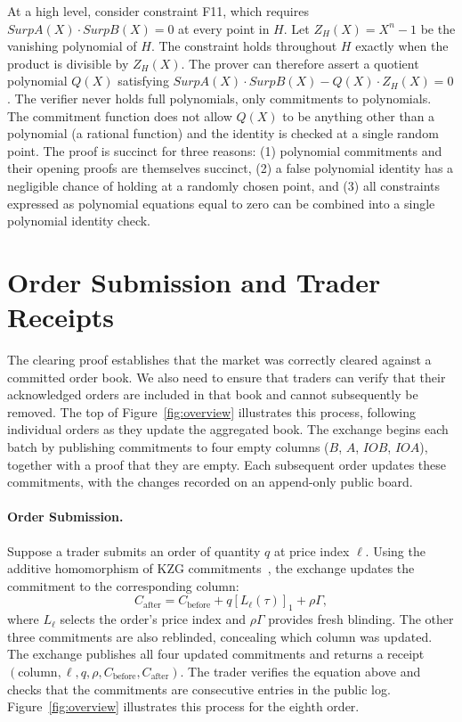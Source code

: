At a high level, consider constraint F11, which requires $SurpA(X)\cdot SurpB(X)=0$ at every point in $H$. Let $Z_H(X)=X^n-1$ be the vanishing polynomial of $H$. The constraint holds throughout $H$ exactly when the product is divisible by $Z_H(X)$. The prover can therefore assert a quotient polynomial $Q(X)$ satisfying $SurpA(X)\cdot SurpB(X)-Q(X)\cdot Z_H(X)=0$. The verifier never holds full polynomials, only commitments to polynomials. The commitment function does not allow $Q(X)$ to be anything other than a polynomial (\ie a rational function) and the identity is checked at a single random point. The proof is succinct for three reasons: (1) polynomial commitments and their opening proofs are themselves succinct, (2) a false polynomial identity has a negligible chance of holding at a randomly chosen point, and (3) all constraints expressed as polynomial equations equal to zero can be combined into a single polynomial identity check.

\section{Order Submission and Trader Receipts}
\label{sec:order-receipts}

The clearing proof establishes that the market was correctly cleared against a committed order book. We also need to ensure that traders can verify that their acknowledged orders are included in that book and cannot subsequently be removed. The top of Figure~\ref{fig:overview} illustrates this process, following individual orders as they update the aggregated book. The exchange begins each batch by publishing commitments to four empty columns ($B$, $A$, $IOB$, $IOA$), together with a proof that they are empty. Each subsequent order updates these commitments, with the changes recorded on an append-only public board.

\paragraph{Order Submission.}
Suppose a trader submits an order of quantity $q$ at price index $\ell$. Using the additive homomorphism of KZG commitments~\cite{KZG10}, the exchange updates the commitment to the corresponding column:
\[
C_{\mathrm{after}}=C_{\mathrm{before}}+q[L_\ell(\tau)]_1+\rho\Gamma,
\]
where $L_\ell$ selects the order's price index and $\rho\Gamma$ provides fresh blinding. The other three commitments are also reblinded, concealing which column was updated. The exchange publishes all four updated commitments and returns a receipt $(\mathrm{column},\ell,q,\rho,C_{\mathrm{before}},C_{\mathrm{after}})$. The trader verifies the equation above and checks that the commitments are consecutive entries in the public log. Figure~\ref{fig:overview} illustrates this process for the eighth order.

